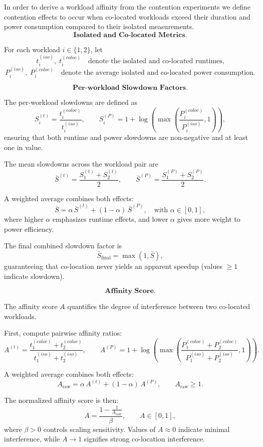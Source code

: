 In order to derive a workload affinity from the contention experiments we define contention effects to occur when co-located workloads exceed their duration and power consumption compared to their isolated measurements.
\[
    \textbf{Isolated and Co-located Metrics.}
\]

For each workload \( i \in \{1,2\} \), let
\[
    t_i^{(iso)}, \; t_i^{(coloc)} \quad \text{denote the isolated and co-located runtimes,}
\]
\[
    P_i^{(iso)}, \; P_i^{(coloc)} \quad \text{denote the average isolated and co-located power consumption.}
\]

\[
    \textbf{Per-workload Slowdown Factors.}
\]

The per-workload slowdowns are defined as
\[
    S_i^{(t)} = \frac{t_i^{(coloc)}}{t_i^{(iso)}},
    \qquad
    S_i^{(P)} = 1 + \log\!\left(
    \max\!\left( \frac{P_i^{(coloc)}}{P_i^{(iso)}}, 1 \right)
    \right),
\]
ensuring that both runtime and power slowdowns are
non-negative and at least one in value.

The mean slowdowns across the workload pair are
\[
    \bar{S}^{(t)} = \frac{S_1^{(t)} + S_2^{(t)}}{2},
    \qquad
    \bar{S}^{(P)} = \frac{S_1^{(P)} + S_2^{(P)}}{2}.
\]

A weighted average combines both effects:
\[
    \bar{S} =
    \alpha\, \bar{S}^{(t)} + (1 - \alpha)\, \bar{S}^{(P)},
    \quad \text{with } \alpha \in [0,1],
\]
where higher \(\alpha\) emphasizes runtime effects,
and lower \(\alpha\) gives more weight to power efficiency.

The final combined slowdown factor is
\[
    \bar{S}_{\text{final}} = \max(1, \bar{S}),
\]
guaranteeing that co-location never yields an apparent
speedup (values \(\ge 1\) indicate slowdown).

\[
    \textbf{Affinity Score.}
\]

The affinity score \(A\) quantifies the degree of
interference between two co-located workloads.

First, compute pairwise affinity ratios:
\[
    A^{(t)} =
    \frac{t_1^{(coloc)} + t_2^{(coloc)}}
    {t_1^{(iso)} + t_2^{(iso)}},
    \qquad
    A^{(P)} =
    1 + \log\!\left(
    \max\!\left(
    \frac{P_1^{(coloc)} + P_2^{(coloc)}}
    {P_1^{(iso)} + P_2^{(iso)}},
    1
    \right)
    \right).
\]

A weighted average combines both effects:
\[
    A_{\text{raw}} =
    \alpha\, A^{(t)} + (1 - \alpha)\, A^{(P)},
    \qquad A_{\text{raw}} \ge 1.
\]

The normalized affinity score is then:
\[
    A =
    \frac{1 - \frac{1}{A_{\text{raw}}}}{\beta},
    \qquad A \in [0, 1],
\]
where \(\beta > 0\) controls scaling sensitivity.
Values of $A \approx 0$ indicate minimal interference,
while \(A \to 1\) signifies strong co-location interference.


